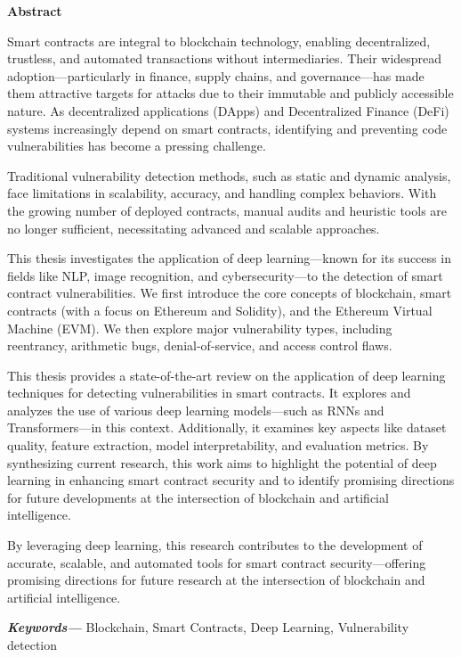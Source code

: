 \vspace*{4cm}
\begin{center}
    {\Large\bf Abstract}
\end{center} \vskip 0.5cm \vskip 0.5cm
Smart contracts are integral to blockchain technology, enabling decentralized, trustless, and automated transactions without intermediaries. Their widespread adoption—particularly in finance, supply chains, and governance—has made them attractive targets for attacks due to their immutable and publicly accessible nature. As decentralized applications (DApps) and Decentralized Finance (DeFi) systems increasingly depend on smart contracts, identifying and preventing code vulnerabilities has become a pressing challenge.

Traditional vulnerability detection methods, such as static and dynamic analysis, face limitations in scalability, accuracy, and handling complex behaviors. With the growing number of deployed contracts, manual audits and heuristic tools are no longer sufficient, necessitating advanced and scalable approaches.

This thesis investigates the application of deep learning—known for its success in fields like NLP, image recognition, and cybersecurity—to the detection of smart contract vulnerabilities. We first introduce the core concepts of blockchain, smart contracts (with a focus on Ethereum and Solidity), and the Ethereum Virtual Machine (EVM). We then explore major vulnerability types, including reentrancy, arithmetic bugs, denial-of-service, and access control flaws.

This thesis provides a state-of-the-art review on the application of deep learning techniques for detecting vulnerabilities in smart contracts. It explores and analyzes the use of various deep learning models—such as RNNs and Transformers—in this context. Additionally, it examines key aspects like dataset quality, feature extraction, model interpretability, and evaluation metrics.
By synthesizing current research, this work aims to highlight the potential of deep learning in enhancing smart contract security and to identify promising directions for future developments at the intersection of blockchain and artificial intelligence.

By leveraging deep learning, this research contributes to the development of accurate, scalable, and automated tools for smart contract security—offering promising directions for future research at the intersection of blockchain and artificial intelligence.
\providecommand{\keywords}[1] {
  \small	
  \textbf{\textit{Keywords---}} #1
}
\keywords{Blockchain, Smart Contracts, Deep Learning, Vulnerability detection}
